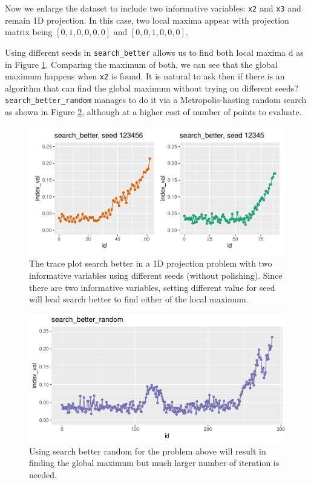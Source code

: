 \documentclass[12pt]{article}
\begin{document}
Now we enlarge the dataset to include two informative variables:
\texttt{x2} and \texttt{x3} and remain 1D projection. In this case, two
local maxima appear with projection matrix being \([0, 1, 0, 0, 0, 0]\)
and \([0, 0, 1 ,0, 0, 0]\).

Using different seeds in \texttt{search\_better} allows us to find both
local maxima d as in Figure \ref{1d-2var-different-seeds}. Comparing the
maximum of both, we can see that the global maximum happens when
\texttt{x2} is found. It is natural to ask then if there is an algorithm
that can find the global maximum without trying on different seeds?
\texttt{search\_better\_random} manages to do it via a
Metropolis-hasting random search as shown in Figure
\ref{1d-2var-better-random}, although at a higher cost of number of
points to evaluate.

\begin{figure}
\centering
\includegraphics{paper_files/figure-latex/1d-2var-different-seeds-1.pdf}
\caption{\label{1d-2var-different-seeds}The trace plot search better in
a 1D projection problem with two informative variables using different
seeds (without polishing). Since there are two informative variables,
setting different value for seed will lead search better to find either
of the local maximum.}
\end{figure}

\begin{figure}
\centering
\includegraphics{paper_files/figure-latex/1d-2var-better-random-1.pdf}
\caption{\label{1d-2var-better-random}Using search better random for the
problem above will result in finding the global maximum but much larger
number of iteration is needed.}
\end{figure}
\end{document}
